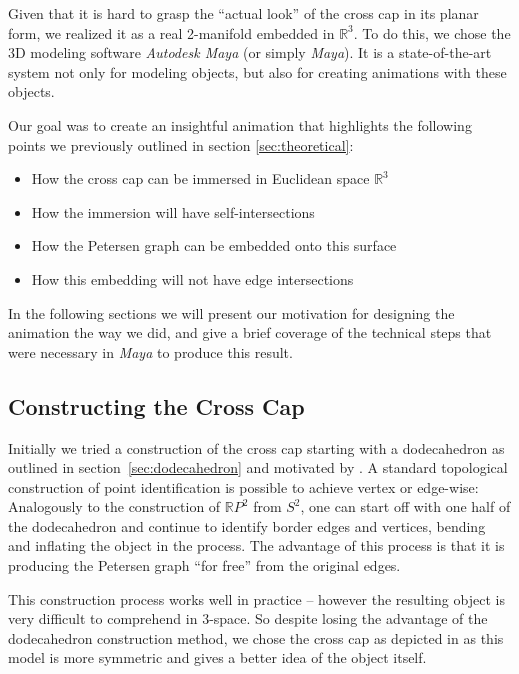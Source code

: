 \documentclass[11pt,            %
               a4paper,         %
               oneside,         %
               DIV12,           %
               fleqn,           %
               halfparskip,     %
               nochapterprefix, %
              ]{scrartcl} %
\theoremstyle{definition}
\begin{document}
Given that it is hard to grasp the “actual look” of the cross cap
in its planar form, we realized it as a real 2-manifold embedded in
$\mathbb{R}^3$. To do this, we chose the 3D modeling software
\emph{Autodesk Maya\textregistered} (or simply \emph{Maya}). It is a state-of-the-art
system not only for modeling objects, but also for creating animations
with these objects.

Our goal was to create an insightful animation that highlights the
following points we previously outlined in section
\ref{sec:theoretical}:

\begin{itemize}
  \item How the cross cap can be immersed in Euclidean space $\mathbb{R}^3$
  \item How the immersion will have self-intersections
  \item How the Petersen graph can be embedded onto this surface
  \item How this embedding will not have edge intersections
\end{itemize}

In the following sections we will present our motivation for designing
the animation the way we did, and give a brief coverage of the
technical steps that were necessary in \emph{Maya} to produce this
result.

\subsection{Constructing the Cross Cap}

Initially we tried a construction of the cross cap starting with a
dodecahedron as outlined in section~\ref{sec:dodecahedron} and
motivated by \cite[p.~270f]{bilderbuch}.
A standard topological construction of point identification is
possible to achieve vertex or edge-wise:
Analogously to the construction of $\mathbb{R}P^2$ from $S^2$,
one can start off with one half of the dodecahedron and continue to
identify border edges and vertices, bending and inflating the object
in the process.
The advantage of this process is that it is producing the Petersen
graph “for free” from the original edges.

This construction process works well in practice -- however the
resulting object is very difficult to comprehend in 3-space.
So despite losing the advantage of the dodecahedron construction
method, we chose the cross cap as depicted in \cite[section~1.7]{rp2}
as this model is more symmetric and gives a better idea of the object
itself.
\end{document}
